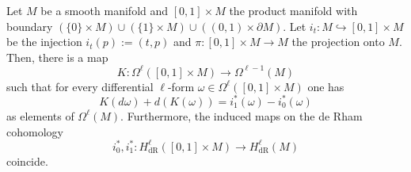 \begin{theorem}\label{thm:deRham-invariance}
  Let $M$ be a smooth manifold and $[0,1]\times M$ the product manifold with boundary $(\{0\}\times M) \cup (\{1\}\times M) \cup ((0,1)\times\partial M)$.
  Let $i_t : M \hookrightarrow [0,1]\times M$ be the injection $i_t(p) := (t,p)$ and $\pi : [0,1]\times M \to M$ the projection onto $M$.
  Then, there is a map
  \begin{equation}
    K : \Omega^\ell([0,1]\times M)\to \Omega^{\ell-1}(M)
  \end{equation}
  such that for every differential $\ell$-form $\omega\in\Omega^\ell([0,1]\times M)$ one has
  \begin{equation}
    K(d\omega) + d(K(\omega)) = i^*_1(\omega) - i^*_0(\omega)
  \end{equation}
  as elements of $\Omega^\ell(M)$.
  Furthermore, the induced maps on the de Rham cohomology
  \begin{equation}
    i_0^*, i_1^* : H_{\mathrm{dR}}^\ell([0,1]\times M) \to H_{\mathrm{dR}}^\ell(M)
  \end{equation}
  coincide.
\end{theorem}
